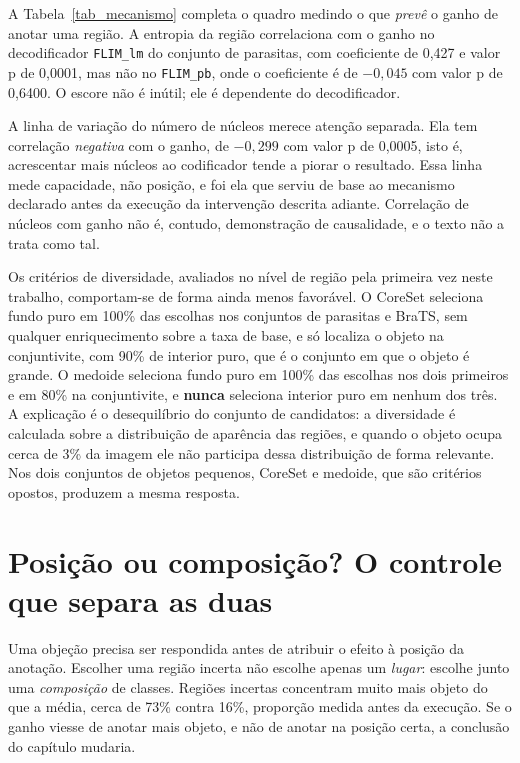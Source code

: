 A Tabela~\ref{tab_mecanismo} completa o quadro medindo o que \emph{prevê} o ganho de anotar uma região. A entropia da região correlaciona com o ganho no decodificador \texttt{FLIM\_lm} do conjunto de parasitas, com coeficiente de 0,427 e valor p de 0,0001, mas não no \texttt{FLIM\_pb}, onde o coeficiente é de $-0{,}045$ com valor p de 0,6400. O escore não é inútil; ele é dependente do decodificador.

\begin{table}[htb]
\centering
\caption{O que prevê o ganho de anotar uma região.}
\label{tab_mecanismo}

\end{table}



A linha de variação do número de núcleos merece atenção separada. Ela tem correlação \emph{negativa} com o ganho, de $-0{,}299$ com valor p de 0,0005, isto é, acrescentar mais núcleos ao codificador tende a piorar o resultado. Essa linha mede capacidade, não posição, e foi ela que serviu de base ao mecanismo declarado antes da execução da intervenção descrita adiante. Correlação de núcleos com ganho não é, contudo, demonstração de causalidade, e o texto não a trata como tal.

Os critérios de diversidade, avaliados no nível de região pela primeira vez neste trabalho, comportam-se de forma ainda menos favorável. O CoreSet seleciona fundo puro em 100\% das escolhas nos conjuntos de parasitas e BraTS, sem qualquer enriquecimento sobre a taxa de base, e só localiza o objeto na conjuntivite, com 90\% de interior puro, que é o conjunto em que o objeto é grande. O medoide seleciona fundo puro em 100\% das escolhas nos dois primeiros e em 80\% na conjuntivite, e \textbf{nunca} seleciona interior puro em nenhum dos três. A explicação é o desequilíbrio do conjunto de candidatos: a diversidade é calculada sobre a distribuição de aparência das regiões, e quando o objeto ocupa cerca de 3\% da imagem ele não participa dessa distribuição de forma relevante. Nos dois conjuntos de objetos pequenos, CoreSet e medoide, que são critérios opostos, produzem a mesma resposta.

\section{Posição ou composição? O controle que separa as duas}

Uma objeção precisa ser respondida antes de atribuir o efeito à posição da anotação. Escolher uma região incerta não escolhe apenas um \emph{lugar}: escolhe junto uma \emph{composição} de classes. Regiões incertas concentram muito mais objeto do que a média, cerca de 73\% contra 16\%, proporção medida antes da execução. Se o ganho viesse de anotar mais objeto, e não de anotar na posição certa, a conclusão do capítulo mudaria.


